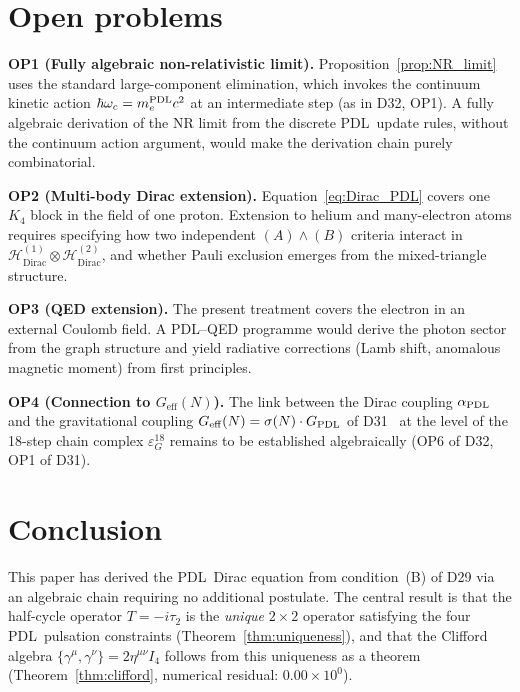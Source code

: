 \documentclass[11pt,a4paper]{article}
\theoremstyle{definition}
\newcommand{\PDL}{\textnormal{PDL}}
\newcommand{\hb}{\hbar}
\newcommand{\aPDL}{\alpha_{\PDL}}
\newcommand{\mePDL}{m_e^{\PDL}}
\newcommand{\HDirac}{\mathcal{H}_{\mathrm{Dirac}}}
\newcommand{\Kfour}{K_4}
\begin{document}
\section{Open problems}
\label{sec:open}

\textbf{OP1 (Fully algebraic non-relativistic limit).} Proposition~\ref{prop:NR_limit} uses the standard large-component elimination, which invokes the continuum kinetic action $\hb\omega_c = \mePDL c^2$ at an intermediate step (as in D32, OP1). A fully algebraic derivation of the NR limit from the discrete \PDL\ update rules, without the continuum action argument, would make the derivation chain purely combinatorial.

\textbf{OP2 (Multi-body Dirac extension).} Equation~\eqref{eq:Dirac_PDL} covers one $\Kfour$ block in the field of one proton. Extension to helium and many-electron atoms requires specifying how two independent $(A)\wedge(B)$ criteria interact in $\HDirac^{(1)} \otimes \HDirac^{(2)}$, and whether Pauli exclusion emerges from the mixed-triangle structure.

\textbf{OP3 (QED extension).} The present treatment covers the electron in an external Coulomb field. A \PDL--QED programme would derive the photon sector from the graph structure and yield radiative corrections (Lamb shift, anomalous magnetic moment) from first principles.

\textbf{OP4 (Connection to $G_{\mathrm{eff}}(N)$).} The link between the Dirac coupling $\aPDL$ and the gravitational coupling $G_{\mathrm{eff}}(N) = \sigma(N)\cdot G_{\PDL}$ of D31~\cite{PDL_D31_2026,Effective_Sigma_PDL_2026} at the level of the 18-step chain complex $\varepsilon_G^{18}$ remains to be established algebraically (OP6 of D32, OP1 of D31).

\section*{Conclusion}

This paper has derived the \PDL\ Dirac equation from condition~(B) of D29 via an algebraic chain requiring no additional postulate. The central result is that the half-cycle operator $T = -i\tau_2$ is the \emph{unique} $2\times2$ operator satisfying the four \PDL\ pulsation constraints (Theorem~\ref{thm:uniqueness}), and that the Clifford algebra $\{\gamma^\mu, \gamma^\nu\} = 2\eta^{\mu\nu}I_4$ follows from this uniqueness as a theorem (Theorem~\ref{thm:clifford}, numerical residual: $0.00\times10^0$).
\end{document}
